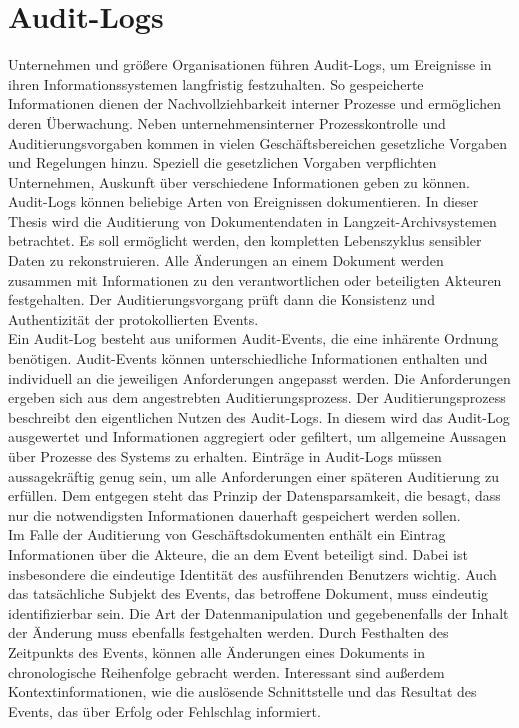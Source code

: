 \section{Audit-Logs}
Unternehmen und größere Organisationen führen Audit-Logs, um Ereignisse in ihren Informationssystemen langfristig festzuhalten. So gespeicherte Informationen dienen der Nachvollziehbarkeit interner Prozesse und ermöglichen deren Überwachung. Neben unternehmensinterner Prozesskontrolle und Auditierungsvorgaben kommen in vielen Geschäftsbereichen gesetzliche Vorgaben und Regelungen hinzu. Speziell die gesetzlichen Vorgaben verpflichten Unternehmen, Auskunft über verschiedene Informationen geben zu können\cite{8280477}. \\
Audit-Logs können beliebige Arten von Ereignissen dokumentieren. In dieser Thesis wird die Auditierung von Dokumentendaten in Langzeit-Archivsystemen betrachtet. Es soll ermöglicht werden, den kompletten Lebenszyklus sensibler Daten zu rekonstruieren. Alle Änderungen an einem Dokument werden zusammen mit Informationen zu den verantwortlichen oder beteiligten Akteuren festgehalten. Der Auditierungsvorgang prüft dann die Konsistenz und Authentizität der protokollierten Events.\\
Ein Audit-Log besteht aus uniformen Audit-Events, die eine inhärente Ordnung benötigen. Audit-Events können unterschiedliche Informationen enthalten und individuell an die jeweiligen Anforderungen angepasst werden. Die Anforderungen ergeben sich aus dem angestrebten Auditierungsprozess. Der Auditierungsprozess beschreibt den eigentlichen Nutzen des Audit-Logs. In diesem wird das Audit-Log ausgewertet und Informationen aggregiert oder gefiltert, um allgemeine Aussagen über Prozesse des Systems zu erhalten.\cite{7118074} Einträge in Audit-Logs müssen aussagekräftig genug sein, um alle Anforderungen einer späteren Auditierung zu erfüllen. Dem entgegen steht das Prinzip der Datensparsamkeit, die besagt, dass nur die notwendigsten Informationen dauerhaft gespeichert werden sollen.\cite{2458973}\\
Im Falle der Auditierung von Geschäftsdokumenten enthält ein Eintrag Informationen über die Akteure, die an dem Event beteiligt sind. Dabei ist insbesondere die eindeutige Identität des ausführenden Benutzers wichtig. Auch das tatsächliche Subjekt des Events, das betroffene Dokument, muss eindeutig identifizierbar sein. Die Art der Datenmanipulation und gegebenenfalls der Inhalt der Änderung muss ebenfalls festgehalten werden. Durch Festhalten des Zeitpunkts des Events, können alle Änderungen eines Dokuments in chronologische Reihenfolge gebracht werden. Interessant sind außerdem Kontextinformationen, wie die auslösende Schnittstelle und das Resultat des Events, das über Erfolg oder Fehlschlag informiert.\cite{7118074}\\
